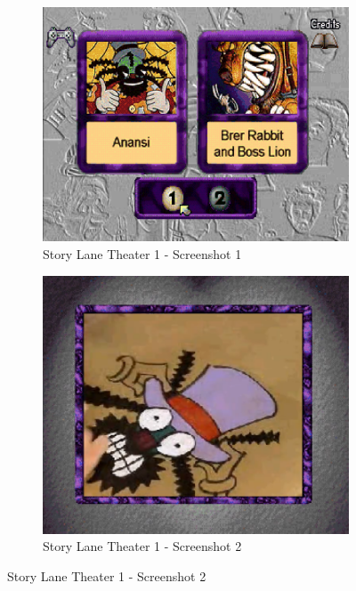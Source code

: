 \begin{figure}[H]
    \centering
    \begin{subfigure}{0.45\textwidth}
        \centering
        \includegraphics[width=\linewidth]{Games/StoryLaneTheater/Images/StoryLaneTheater1Image1.png}
        \caption{Story Lane Theater 1 - Screenshot 1}
    \end{subfigure}
    \begin{subfigure}{0.45\textwidth}
        \includegraphics[width=\linewidth]{Games/StoryLaneTheater/Images/StoryLaneTheater1Image2.png}
        \caption{Story Lane Theater 1 - Screenshot 2}
    \end{subfigure}


\end{figure}
